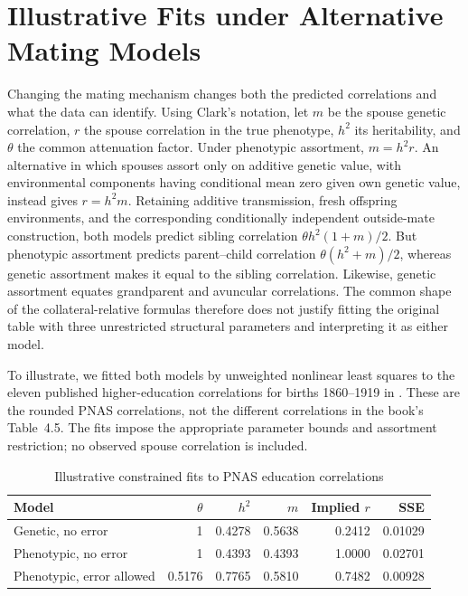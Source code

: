 \section{Illustrative Fits under Alternative Mating Models}
\label{app:assortment-comparison}

Changing the mating mechanism changes both the predicted correlations and
what the data can identify. Using Clark's notation, let $m$ be the spouse
genetic correlation, $r$ the spouse correlation in the true phenotype,
$h^2$ its heritability, and $\theta$ the common attenuation factor. Under
phenotypic assortment, $m=h^2r$. An alternative in which spouses assort
only on additive genetic value, with environmental components having
conditional mean zero given own genetic value, instead gives $r=h^2m$.
Retaining additive transmission, fresh offspring environments, and the
corresponding conditionally independent outside-mate construction, both
models predict sibling correlation $\theta h^2(1+m)/2$. But phenotypic
assortment predicts parent--child correlation $\theta(h^2+m)/2$, whereas
genetic assortment makes it equal to the sibling correlation. Likewise,
genetic assortment equates grandparent and avuncular correlations.
The common shape of the collateral-relative formulas therefore does not
justify fitting the original table with three unrestricted structural
parameters and interpreting it as either model.

To illustrate, we fitted both models by unweighted nonlinear least squares
to the eleven published higher-education correlations for births
1860--1919 in \citet[Table~2]{Clark2023}. These are the rounded PNAS
correlations, not the different correlations in the book's Table~4.5.
The fits impose the appropriate parameter bounds and assortment
restriction; no observed spouse correlation is included.

\begin{table}[htbp]
\centering
\caption{Illustrative constrained fits to PNAS education correlations}
\label{tab:assortment-comparison}
\begin{tabular}{lrrrrr}
\hline
Model & $\theta$ & $h^2$ & $m$ & Implied $r$ & SSE\\
\hline
Genetic, no error & 1 & 0.4278 & 0.5638 & 0.2412 & 0.01029\\
Phenotypic, no error & 1 & 0.4393 & 0.4393 & 1.0000 & 0.02701\\
Phenotypic, error allowed & 0.5176 & 0.7765 & 0.5810 & 0.7482 & 0.00928\\
\hline
\end{tabular}
\end{table}

